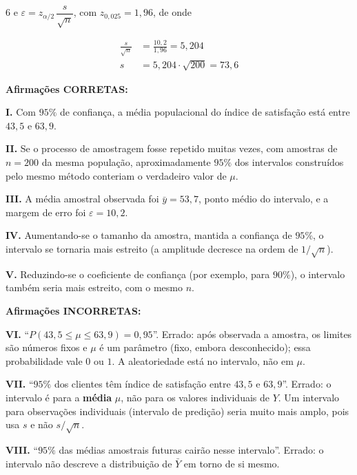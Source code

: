 \documentclass[8pt, a4paper, landscape]{extarticle}
\begin{document}
\begin{multicols}{6}
e $\varepsilon = z_{\alpha/2}\,\dfrac{s}{\sqrt{n}}$, com $z_{0,025} = 1,96$, de onde

\begin{equation*}
\begin{split}
\frac{s}{\sqrt{n}} &= \frac{10,2}{1,96} = 5,204 \\
s &= 5,204 \cdot \sqrt{200} = 73,6
\end{split}
\end{equation*}

\vspace{0.2cm}

\textbf{Afirmações CORRETAS:}

\textbf{I.} Com $95\%$ de confiança, a média populacional do índice de satisfação está entre $43,5$ e $63,9$.

\textbf{II.} Se o processo de amostragem fosse repetido muitas vezes, com amostras de $n = 200$ da mesma população, aproximadamente $95\%$ dos intervalos construídos pelo mesmo método conteriam o verdadeiro valor de $\mu$.

\textbf{III.} A média amostral observada foi $\bar{y} = 53,7$, ponto médio do intervalo, e a margem de erro foi $\varepsilon = 10,2$.

\textbf{IV.} Aumentando-se o tamanho da amostra, mantida a confiança de $95\%$, o intervalo se tornaria mais estreito (a amplitude decresce na ordem de $1/\sqrt{n}$).

\textbf{V.} Reduzindo-se o coeficiente de confiança (por exemplo, para $90\%$), o intervalo também seria mais estreito, com o mesmo $n$.

\vspace{0.2cm}

\textbf{Afirmações INCORRETAS:}

\textbf{VI.} ``$P(43,5 \leq \mu \leq 63,9) = 0,95$''. \newline
Errado: após observada a amostra, os limites são números fixos e $\mu$ é um parâmetro (fixo, embora desconhecido); essa probabilidade vale $0$ ou $1$. A aleatoriedade está no intervalo, não em $\mu$.

\textbf{VII.} ``$95\%$ dos clientes têm índice de satisfação entre $43,5$ e $63,9$''. \newline
Errado: o intervalo é para a \textbf{média} $\mu$, não para os valores individuais de $Y$. Um intervalo para observações individuais (intervalo de predição) seria muito mais amplo, pois usa $s$ e não $s/\sqrt{n}$.

\textbf{VIII.} ``$95\%$ das médias amostrais futuras cairão nesse intervalo''. \newline
Errado: o intervalo não descreve a distribuição de $\bar{Y}$ em torno de si mesmo.


\end{multicols}
\end{document}
